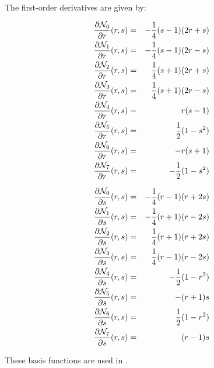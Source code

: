 The first-order derivatives are given by:

\begin{mdframed}[backgroundcolor=blue!5]
\begin{eqnarray}
\frac{\partial {\mathcal{N}}_0}{\partial r}(r,s)&=& -\frac{1}{4}(s-1)(2r+s)  \\
\frac{\partial {\mathcal{N}}_1}{\partial r}(r,s)&=& -\frac{1}{4}(s-1)(2r-s)  \\
\frac{\partial {\mathcal{N}}_2}{\partial r}(r,s)&=& \frac{1}{4}(s+1)(2r+s)  \\
\frac{\partial {\mathcal{N}}_3}{\partial r}(r,s)&=& \frac{1}{4}(s+1)(2r-s)  \\
\frac{\partial {\mathcal{N}}_4}{\partial r}(r,s)&=& r(s-1)  \\
\frac{\partial {\mathcal{N}}_5}{\partial r}(r,s)&=& \frac{1}{2} (1-s^2)  \\
\frac{\partial {\mathcal{N}}_6}{\partial r}(r,s)&=& -r(s+1)  \\
\frac{\partial {\mathcal{N}}_7}{\partial r}(r,s)&=& -\frac{1}{2} (1-s^2)  
\end{eqnarray}
\end{mdframed}

\begin{mdframed}[backgroundcolor=blue!5]
\begin{eqnarray}
\frac{\partial {\mathcal{N}}_0}{\partial s}(r,s)&=& -\frac{1}{4}(r-1)(r+2s) \\
\frac{\partial {\mathcal{N}}_1}{\partial s}(r,s)&=& -\frac{1}{4}(r+1)(r-2s) \\
\frac{\partial {\mathcal{N}}_2}{\partial s}(r,s)&=&  \frac{1}{4}(r+1)(r+2s) \\
\frac{\partial {\mathcal{N}}_3}{\partial s}(r,s)&=&  \frac{1}{4}(r-1)(r-2s) \\
\frac{\partial {\mathcal{N}}_4}{\partial s}(r,s)&=& - \frac{1}{2}(1-r^2)\\
\frac{\partial {\mathcal{N}}_5}{\partial s}(r,s)&=&  -(r+1)s \\
\frac{\partial {\mathcal{N}}_6}{\partial s}(r,s)&=& \frac{1}{2} (1-r^2)\\
\frac{\partial {\mathcal{N}}_7}{\partial s}(r,s)&=&  (r-1)s
\end{eqnarray}
\end{mdframed}

These basis functions are used in .
